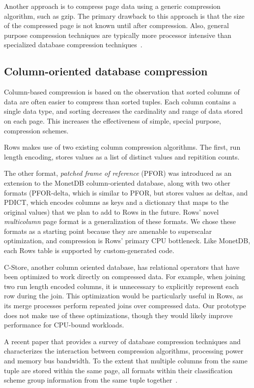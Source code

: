 \documentclass{sig-alternate-sigmod08}
\newcommand{\rows}{Rows\xspace}
\newcommand{\rowss}{Rows'\xspace}
\begin{document}
Another approach is to compress page data using a generic compression
algorithm, such as gzip.  The primary drawback to this approach is
that the size of the compressed page is not known until after
compression.  Also, general purpose compression techniques are
typically more processor intensive than specialized database
compression techniques~\cite{rowImplementationPerf}.

\subsection{Column-oriented database compression}

Column-based compression is based on the observation that sorted
columns of data are often easier to compress than sorted tuples.  Each
column contains a single data type, and sorting decreases the
cardinality and range of data stored on each page.  This increases the
effectiveness of simple, special purpose, compression schemes.

\rows makes use of two existing column compression algorithms.  The
first, run length encoding, stores values as a list of distinct values
and repitition counts.

The other format, {\em patched frame of reference} (PFOR) was
introduced as an extension to the MonetDB\cite{pfor} column-oriented
database, along with two other formats (PFOR-delta, which is similar
to PFOR, but stores values as deltas, and PDICT, which encodes columns
as keys and a dictionary that maps to the original values) that we
plan to add to \rows in the future.  \rowss novel {\em multicolumn}
page format is a generalization of these formats.  We chose these
formats as a starting point because they are amenable to superscalar
optimization, and compression is \rowss primary CPU bottleneck.  Like
MonetDB, each \rows table is supported by custom-generated code.

C-Store, another column oriented database, has relational operators
that have been optimized to work directly on compressed
data\cite{compExec}.  For example, when joining two run length encoded
columns, it is unnecessary to explicitly represent each row during the
join.  This optimization would be particularly useful in \rows, as its
merge processes perform repeated joins over compressed data.  Our
prototype does not make use of these optimizations, though they would
likely improve performance for CPU-bound workloads.

A recent paper that provides a survey of database compression
techniques and characterizes the interaction between compression
algorithms, processing power and memory bus bandwidth.  To the extent
that multiple columns from the same tuple are stored within the same
page, all formats within their classification scheme group information
from the same tuple together~\cite{bitsForChronos}.
\end{document}
